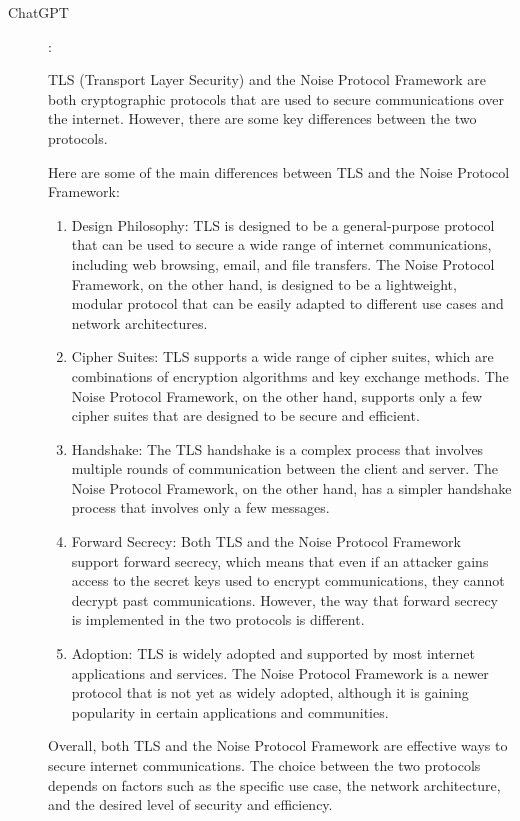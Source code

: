 \begin{description}
\item[ChatGPT]
:

TLS (Transport Layer Security) and the Noise Protocol Framework are both cryptographic protocols that are used to secure communications over the internet. However, there are some key differences between the two protocols.

Here are some of the main differences between TLS and the Noise Protocol Framework:

\begin{enumerate}
\def\labelenumi{\arabic{enumi}.}
\tightlist
\item
  Design Philosophy: TLS is designed to be a general-purpose protocol that can be used to secure a wide range of internet communications, including web browsing, email, and file transfers. The Noise Protocol Framework, on the other hand, is designed to be a lightweight, modular protocol that can be easily adapted to different use cases and network architectures.
\item
  Cipher Suites: TLS supports a wide range of cipher suites, which are combinations of encryption algorithms and key exchange methods. The Noise Protocol Framework, on the other hand, supports only a few cipher suites that are designed to be secure and efficient.
\item
  Handshake: The TLS handshake is a complex process that involves multiple rounds of communication between the client and server. The Noise Protocol Framework, on the other hand, has a simpler handshake process that involves only a few messages.
\item
  Forward Secrecy: Both TLS and the Noise Protocol Framework support forward secrecy, which means that even if an attacker gains access to the secret keys used to encrypt communications, they cannot decrypt past communications. However, the way that forward secrecy is implemented in the two protocols is different.
\item
  Adoption: TLS is widely adopted and supported by most internet applications and services. The Noise Protocol Framework is a newer protocol that is not yet as widely adopted, although it is gaining popularity in certain applications and communities.
\end{enumerate}

Overall, both TLS and the Noise Protocol Framework are effective ways to secure internet communications. The choice between the two protocols depends on factors such as the specific use case, the network architecture, and the desired level of security and efficiency.
\end{description}


